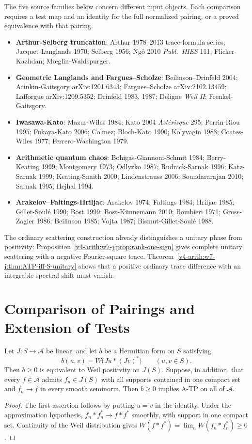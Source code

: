 The five source families below concern different input objects.
Each comparison requires a test map and an identity for the full
normalized pairing, or a proved equivalence with that pairing.

\begin{itemize}
\item \textbf{Arthur-Selberg truncation}: Arthur 1978--2013 trace-formula
series; Jacquet-Langlands 1970; Selberg 1956;
Ng\^{o} 2010 \emph{Publ.~IHES} 111;
Flicker-Kazhdan; M\oe{}glin-Waldspurger.
\item \textbf{Geometric Langlands and Fargues--Scholze}:
Beilinson--Drinfeld 2004; Arinkin-Gaitsgory arXiv:1201.6343;
Fargues--Scholze arXiv:2102.13459; Lafforgue arXiv:1209.5352; Drinfeld
1983, 1987; Deligne \emph{Weil II}; Frenkel-Gaitsgory.
\item \textbf{Iwasawa-Kato}: Mazur-Wiles 1984; Kato 2004
\emph{Ast\'{e}risque} 295; Perrin-Riou 1995; Fukaya-Kato 2006; Colmez;
Bloch-Kato 1990; Kolyvagin 1988; Coates-Wiles 1977; Ferrero-Washington 1979.
\item \textbf{Arithmetic quantum chaos}: Bohigas-Giannoni-Schmit
1984; Berry-Keating 1999; Montgomery 1973; Odlyzko 1987; Rudnick-Sarnak
1996; Katz-Sarnak 1999; Keating-Snaith 2000; Lindenstrauss 2006;
Soundararajan 2010; Sarnak 1995; Hejhal 1994.
\item \textbf{Arakelov--Faltings-Hriljac}: Arakelov 1974;
Faltings 1984; Hriljac 1985; Gillet-Soul\'{e} 1990; Bost 1999;
Bost-K\"{u}nnemann 2010; Bombieri 1971; Gross-Zagier 1986; Beilinson 1985;
Vojta 1987; Bismut-Gillet-Soul\'{e} 1988.
\end{itemize}

The ordinary scattering construction already distinguishes a unitary
phase from positivity: Proposition~\ref{v4-arith:w7-j:prop:rank-one-sign}
gives complete unitary scattering with a negative Fourier-square trace.
Theorem~\ref{v4-arith:w7-j:thm:ATP-iff-S-unitary} shows that a positive
ordinary trace difference with an integrable spectral shift must vanish.

\section{Comparison of Pairings and Extension of Tests}
\label{v4-arith:w8-atp:convergence}

\begin{theorem}
\label{v4-arith:w8-atp:thm:convergence}
Let $J:S\to\mathscr A$ be linear, and let $b$ be a Hermitian
form on $S$ satisfying
\[
 b(u,v)=W\bigl(Ju*(Jv)^*\bigr)\qquad(u,v\in S).
\]
Then $b\geq0$ is equivalent to Weil positivity on $J(S)$.
Suppose, in addition, that every $f\in\mathscr A$ admits
$f_n\in J(S)$ with all supports contained in one compact set
and $f_n\to f$ in every smooth seminorm. Then $b\geq0$
implies A-TP on all of $\mathscr A$.
\end{theorem}
\begin{proof}
The first assertion follows by putting $u=v$ in the identity.
Under the approximation hypothesis,
$f_n*f_n^*\to f*f^*$ smoothly, with support in one compact
set. Continuity of the Weil distribution gives
$W(f*f^*)=\lim_n W(f_n*f_n^*)\geq0$.
\end{proof}

